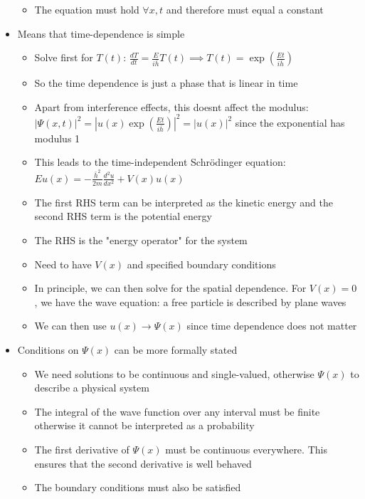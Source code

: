 \documentclass[12pt]{article}
\begin{document}
\begin{itemize}
\begin{itemize}
        \item The equation must hold $\forall x, t$ and therefore must equal a constant
    \end{itemize}
    \item Means that time-dependence is simple \begin{itemize}
        \item Solve first for $T(t)$: $\frac{dT}{dt} = \frac{E}{i \bar{h}} T(t) \implies T(t) = \exp(\frac{Et}{i \bar{h}})$
        \item So the time dependence is just a phase that is linear in time 
        \item Apart from interference effects, this doesnt affect the modulus: $| \varPsi(x, t)|^2 = | u(x) \exp(\frac{Et}{i \bar{h}}) | ^2 = |u(x)|^2$ since the exponential has modulus 1
        \item This leads to the time-independent Schr\"{o}dinger equation: $Eu(x) = - \frac{\bar{h}^2}{2m} \frac{d^2 u}{dx^2} + V(x)u(x)$
        \item The first RHS term can be interpreted as the kinetic energy and the second RHS term is the potential energy
        \item The RHS is the "energy operator" for the system
        \item Need to have $V(x)$ and specified boundary conditions 
        \item In principle, we can then solve for the spatial dependence. For $V(x) = 0$, we have the wave equation: a free particle is described by plane waves
        \item We can then use $u(x) \rightarrow \varPsi(x)$ since time dependence does not matter
    \end{itemize}
    \item Conditions on $\varPsi(x)$ can be more formally stated \begin{itemize}
        \item We need solutions to be continuous and single-valued, otherwise $\varPsi(x)$ to describe a physical system
        \item The integral of the wave function over any interval must be finite otherwise it cannot be interpreted as a probability
        \item The first derivative of $\varPsi(x)$ must be continuous everywhere. This ensures that the second derivative is well behaved
        \item The boundary conditions must also be satisfied
    \end{itemize}

\end{itemize}
\end{document}
